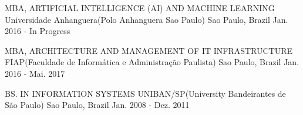 

\begin{cventries}

  \cventry
  {MBA, ARTIFICIAL INTELLIGENCE (AI) AND MACHINE LEARNING} %
  {Universidade Anhanguera(Polo Anhanguera Sao Paulo)} %
  {Sao Paulo, Brazil} %
  {Jan. 2016 - In Progress} %
  {
    \begin{cvitems} %
    \end{cvitems}
  }

  \cventry
    {MBA, ARCHITECTURE AND MANAGEMENT OF IT INFRASTRUCTURE} %
    {FIAP(Faculdade de Informática e Administração Paulista)} %
    {Sao Paulo, Brazil} %
    {Jan. 2016 - Mai. 2017} %
    {
      \begin{cvitems} %
      \end{cvitems}
    }
  
  \cventry
    {BS. IN INFORMATION SYSTEMS} %
    {UNIBAN/SP(University Bandeirantes de São Paulo)} %
    {Sao Paulo, Brazil} %
    {Jan. 2008 - Dez. 2011} %
    {
      \begin{cvitems} %
      \end{cvitems}
    }

\end{cventries}
